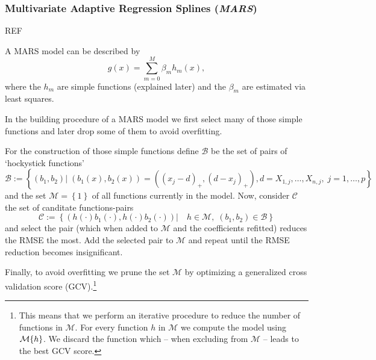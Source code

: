 \subsubsection*{Multivariate Adaptive Regression Splines (\textit{MARS})}{
    REF\cite{friedmanMultivariateAdaptiveRegression1991}

    A MARS model can be described by 
    \begin{equation}
        \label{eq:mars}
        g(x) = \sum_{m=0}^M \beta_m h_m(x),
    \end{equation}
    where the $h_m$ are simple functions (explained later) and the $\beta_m$ are estimated via least squares. 
    
    In the building procedure of a MARS model we first select many of those simple functions and later drop some of them to avoid overfitting. 
    
    For the construction of those simple functions define $\mathcal{B}$ be the set of pairs of `hockystick functions'
    \begin{equation}
        \label{eq:mars_basis_fun}
        \mathcal{B}:=\left\{
            \left(b_1,b_2\right) 
            | \;
            \left(b_1(x),b_2(x)\right) = \left(\left(x_{j}-d\right)_+,\left(d-x_{j}\right)_+\right),
            d =X_{1, j},  \ldots, X_{n, j},\;
            j=1, \ldots, p
        \right\}
    \end{equation}
    and the set $\mathcal{M}=\left\{1\right\}$ of all functions currently in the model. Now, consider $\mathcal{C}$ the set of canditate functions-pairs 
    \begin{equation}
        \label{eq:mars_candidate}
        \mathcal{C}:=\left\{
            \left(h(\cdot)b_1(\cdot),  h(\cdot)b_2(\cdot) \right)
            | \quad h\in\mathcal{M}, \; 
            (b_1,b_2) \in \mathcal{B}
        \right\}
    \end{equation}
    and select the pair (which when added to $\mathcal{M}$ and the coefficients refitted) reduces the RMSE the most. Add the selected pair to $\mathcal{M}$ and repeat until the RMSE reduction becomes insignificant.

    Finally, to avoid overfitting we prune the set $\mathcal{M}$ by optimizing a generalized cross validation score (GCV).\footnote{This means that we perform an iterative procedure to reduce the number of functions in $\mathcal{M}$. For every function $h$ in $\mathcal{M}$ we compute the model using $\mathcal{M}\\\{h\}$. We discard the function which -- when excluding from $\mathcal{M}$ -- leads to the best GCV score.}  

}
